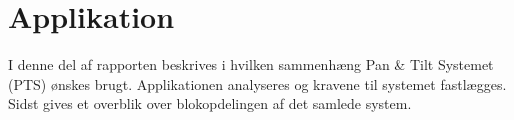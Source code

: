 \cleardoublepage
{}
\setcounter{page}{1}
\part{Applikation}
I denne del af rapporten beskrives i hvilken sammenhæng Pan \& Tilt Systemet (PTS) ønskes brugt. 
Applikationen analyseres og kravene til systemet fastlægges. 
Sidst gives et overblik over blokopdelingen af det samlede system. 


\newpage

